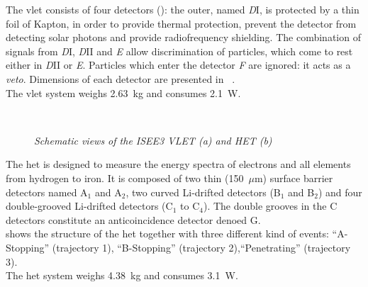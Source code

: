 The \gls{vlet} consists of four detectors
(): the outer, named {\it D}I, is protected
by a thin foil of Kapton, in order to provide thermal protection,
prevent the detector from detecting solar photons and provide
radiofrequency shielding. The combination of signals from {\it D}I,
{\it D}II and {\it E} allow discrimination of particles, which come to
rest either in {\it D}II or {\it E}. Particles which enter the
detector {\it F} are ignored: it acts as a {\em veto}. Dimensions of
each detector are presented in ~.\\
The \gls{vlet} system weighs 2.63~kg and consumes 2.1~W.\\
\begin{figure}
  \centering
   \\
  \caption{\textit{Schematic views of the ISEE3 VLET (a) and HET (b)}}\label{isee3-telescopes}
\end{figure}

The \gls{het} is designed to measure the energy spectra of electrons
and all elements from hydrogen to iron. It is composed of two thin
(150~$\mu$m) surface barrier detectors named A$_1$ and A$_2$,
two curved Li-drifted detectors (B$_1$ and B$_2$) and four
double-grooved Li-drifted detectors (C$_1$ to C$_4$). The double
grooves in the C detectors constitute an anticoincidence
detector denoed G.\\
 shows the structure of the \gls{het}
together with three different kind of events: ``A-Stopping''
(trajectory 1), ``B-Stopping'' (trajectory 2),``Penetrating''
(trajectory 3).\\
The \gls{het} system weighs 4.38~kg and consumes 3.1~W.\\

